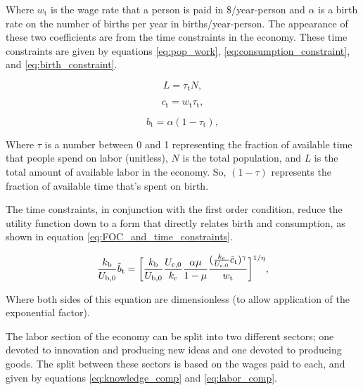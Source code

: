 \documentclass[letterpaper,12pt]{article}
\begin{document}
Where $w_\mathrm{t}$ is the wage rate that a person is paid in \$/year-person and $\alpha$ is a birth rate on the number of births per year in births/year-person. The appearance of these two coefficients are from the time constraints in the economy. These time constraints are given by equations \ref{eq:pop_work}, \ref{eq:consumption_constraint}, and \ref{eq:birth_constraint}.

\begin{equation}\label{eq:pop_work}
L = \tau_\mathrm{t} N,
\end{equation}

\begin{equation} \label{eq:consumption_constraint}
c_\mathrm{t} = w_\mathrm{t} \tau_\mathrm{t},
\end{equation}

\begin{equation} \label{eq:birth_constraint}
b_\mathrm{t} = \alpha (1-\tau_\mathrm{t}),
\end{equation}

Where $\tau$ is a number between 0 and 1 representing the fraction of available time that people spend on labor (unitless), $N$ is the total population, and $L$ is the total amount of available labor in the economy. So, $(1-\tau)$ represents the fraction of available time that's spent on birth.

The time constraints, in conjunction with the first order condition, reduce the utility function down to a form that directly relates birth and consumption, as shown in equation \ref{eq:FOC_and_time_constraints}.

\begin{equation} \label{eq:FOC_and_time_constraints}
\frac{k_\mathrm{b}}{U_\mathrm{b,0}} \tilde b_\mathrm{t} = \bigg{[} \frac{k_\mathrm{b}}{U_\mathrm{b,0}} \frac{U_\mathrm{c,0}}{k_\mathrm{c}} \frac{\alpha \mu}{1-\mu} \frac{( \frac{k_\mathrm{c}}{U_\mathrm{c,0}} \tilde c_\mathrm{t} )^\gamma}{w_\mathrm{t}}\bigg{]}^{1/\eta} ,
\end{equation}

Where both sides of this equation are dimensionless (to allow application of the exponential factor).

The labor section of the economy can be split into two different sectors; one devoted to innovation and producing new ideas and one devoted to producing goods. The split between these sectors is based on the wages paid to each, and given by equations \ref{eq:knowledge_comp} and \ref{eq:labor_comp}.
\end{document}
